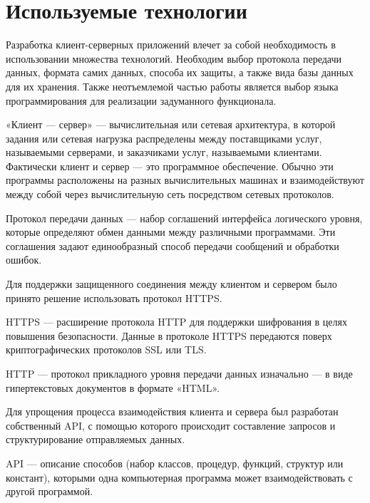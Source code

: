 \clearpage
\section{Используемые технологии}
Разработка клиент-серверных приложений влечет за собой необходимость в использовании множества технологий.
Необходим выбор протокола передачи данных, формата самих данных, способа их защиты, а также вида базы данных для их хранения.
Также неотъемлемой частью работы является выбор языка программирования для реализации задуманного функционала.

\begin{definition}
   «Клиент --- сервер» --- вычислительная или сетевая архитектура, в которой задания или сетевая нагрузка распределены между поставщиками услуг,
   называемыми серверами, и заказчиками услуг, называемыми клиентами. Фактически клиент и сервер --- это программное обеспечение.
   Обычно эти программы расположены на разных вычислительных машинах и взаимодействуют между собой через вычислительную сеть посредством сетевых протоколов.
\end{definition}

\begin{definition}
   Протокол передачи данных --- набор соглашений интерфейса логического уровня, которые определяют обмен данными между различными программами.
   Эти соглашения задают единообразный способ передачи сообщений и обработки ошибок.
\end{definition}

Для поддержки защищенного соединения между клиентом и сервером было принято решение использовать протокол HTTPS.
\begin{definition}
   HTTPS --- расширение протокола HTTP для поддержки шифрования в целях повышения безопасности.
   Данные в протоколе HTTPS передаются поверх криптографических протоколов SSL или TLS.
\end{definition}

\begin{definition}
   HTTP --- протокол прикладного уровня передачи данных изначально --- в виде гипертекстовых документов в формате «HTML».
\end{definition}

Для упрощения процесса взаимодействия клиента и сервера был разработан собственный API,
с помощью которого происходит составление запросов и структурирование отправляемых данных.
\begin{definition}
   API --- описание способов (набор классов, процедур, функций, структур или констант),
   которыми одна компьютерная программа может взаимодействовать с другой программой.
\end{definition}

